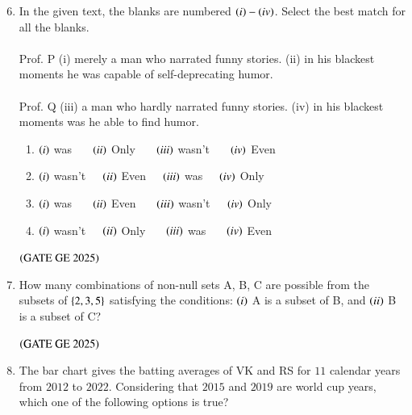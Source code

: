 \documentclass[journal,12pt,onecolumn]{IEEEtran}
\theoremstyle{remark}
\begin{document}
\begin{enumerate}
\setcounter{enumi}{5}
\item In the given text, the blanks are numbered $\left(i\right)-\left(iv\right)$.
Select the best match for all the blanks. \\
\\Prof. P \underline{\hspace{1cm}} (i) \underline{\hspace{1cm}} merely a man who narrated funny stories.
\underline{\hspace{1cm}} (ii) \underline{\hspace{1cm}} in his blackest moments he was capable of self-deprecating humor. \\
\\Prof.
Q \underline{\hspace{1cm}} (iii) \underline{\hspace{1cm}} a man who hardly narrated funny stories.
\underline{\hspace{1cm}} (iv) \underline{\hspace{1cm}} in his blackest moments was he able to find humor.
\begin{enumerate}
\item $\left(i\right)$ was \ \ \ $\left(ii\right)$ Only \ \ \   $\left(iii\right)$ wasn't \ \ \ $\left(iv\right)$ Even
\item $\left(i\right)$ wasn't\ \ \  $\left(ii\right)$ Even\ \ \  $\left(iii\right)$ was\ \ \  $\left(iv\right)$ Only
\item $\left(i\right)$ was \ \ \ $\left(ii\right)$ Even \ \ \ $\left(iii\right)$ wasn't\ \ \  $\left(iv\right)$ Only
\item $\left(i\right)$ wasn't\ \ \  $\left(ii\right)$ Only \ \ \ $\left(iii\right)$ was \ \ \ $\left(iv\right)$ Even
\end{enumerate}
\hfill $\left(\text{GATE GE 2025}\right)$
\bigskip
\item How many combinations of non-null sets A, B, C are possible from the subsets of $\left\{2,3,5\right\}$ satisfying the conditions: $\left(i\right)$ A is a subset of B, and 
$\left(ii\right)$ B is a subset of C?
\begin{enumerate}
\end{enumerate}
\hfill $\left(\text{GATE GE 2025}\right)$
\bigskip
\item The bar chart  gives the batting averages of VK and RS for $11$ calendar years from $2012$ to $2022$. Considering that $2015$ and $2019$ are world cup years, which one of the following options is true?\\

\end{enumerate}
\end{document}
